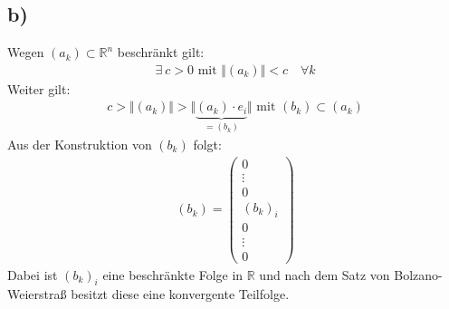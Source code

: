 \documentclass[11pt,a4paper]{article}
\newcommand {\R}	{\mathbb{R}}
\newcommand {\Rn}	{\mathbb{R}^n}
\newcommand{\1}    	{\mathbbm{1}}
\newcommand{\mitt}	{\textrm{ mit }}
\begin{document}
	\subsection*{b)}
	Wegen \((a_k) \subset \Rn\) beschränkt gilt:
	\begin{align*}
		\exists~ c > 0 \mitt \Vert (a_k) \Vert < c \quad \forall k
	\end{align*}
	Weiter gilt:
	\begin{align*}
		c > \Vert (a_k) \Vert > \Vert \underbrace{(a_k) \cdot e_i}_{= (b_k)} \Vert \mitt (b_k) \subset (a_k)
	\end{align*}
	Aus der Konstruktion von \((b_k)\) folgt:
	\begin{align*}
		(b_k) = \left( \begin{array}{c}
			0 \\ \vdots \\ 0 \\
			(b_k)_i \\
			0 \\ \vdots \\ 0
		\end{array} \right)
	\end{align*}
	Dabei ist \((b_k)_i\) eine beschränkte Folge in \(\R\) und nach dem Satz von Bolzano-Weierstraß besitzt diese eine konvergente Teilfolge.
	
	
\end{document}
